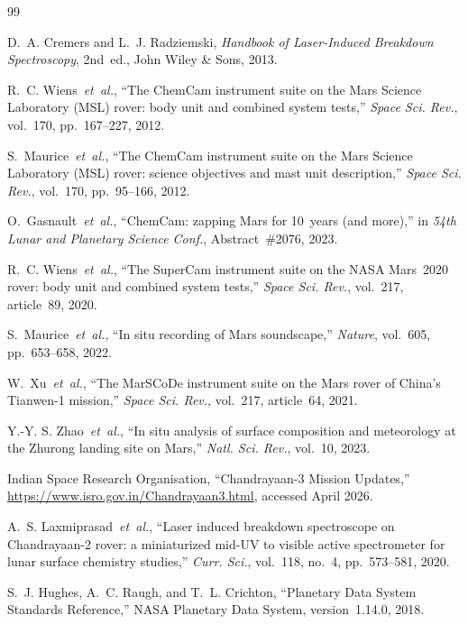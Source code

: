 \documentclass[a4paper,twocolumn,10pt]{article}
\begin{document}
\begin{thebibliography}{99}

D.~A. Cremers and L.~J. Radziemski,
\textit{Handbook of Laser-Induced Breakdown Spectroscopy}, 2nd~ed.,
John Wiley \& Sons, 2013.

R.~C. Wiens~\emph{et~al.},
``The ChemCam instrument suite on the Mars Science Laboratory (MSL)
rover: body unit and combined system tests,''
\textit{Space Sci. Rev.}, vol.~170, pp.~167--227, 2012.

S.~Maurice~\emph{et~al.},
``The ChemCam instrument suite on the Mars Science Laboratory (MSL)
rover: science objectives and mast unit description,''
\textit{Space Sci. Rev.}, vol.~170, pp.~95--166, 2012.

O.~Gasnault~\emph{et~al.},
``ChemCam: zapping Mars for 10~years (and more),''
in \textit{54th Lunar and Planetary Science Conf.}, Abstract~\#2076,
2023.

R.~C. Wiens~\emph{et~al.},
``The SuperCam instrument suite on the NASA Mars~2020 rover: body
unit and combined system tests,''
\textit{Space Sci. Rev.}, vol.~217, article~89, 2020.

S.~Maurice~\emph{et~al.},
``In situ recording of Mars soundscape,''
\textit{Nature}, vol.~605, pp.~653--658, 2022.

W.~Xu~\emph{et~al.},
``The MarSCoDe instrument suite on the Mars rover of China's
Tianwen-1 mission,''
\textit{Space Sci. Rev.}, vol.~217, article~64, 2021.

Y.-Y. S. Zhao~\emph{et~al.},
``In situ analysis of surface composition and meteorology at the
Zhurong landing site on Mars,''
\textit{Natl. Sci. Rev.}, vol.~10, 2023.

Indian Space Research Organisation,
``Chandrayaan-3 Mission Updates,''
\url{https://www.isro.gov.in/Chandrayaan3.html},
accessed April 2026.

A.~S. Laxmiprasad~\emph{et~al.},
``Laser induced breakdown spectroscope on Chandrayaan-2 rover:
a miniaturized mid-UV to visible active spectrometer for lunar surface
chemistry studies,''
\textit{Curr. Sci.}, vol.~118, no.~4, pp.~573--581, 2020.

S.~J. Hughes, A.~C. Raugh, and T.~L. Crichton,
``Planetary Data System Standards Reference,''
NASA Planetary Data System, version~1.14.0, 2018.


\end{thebibliography}
\end{document}

